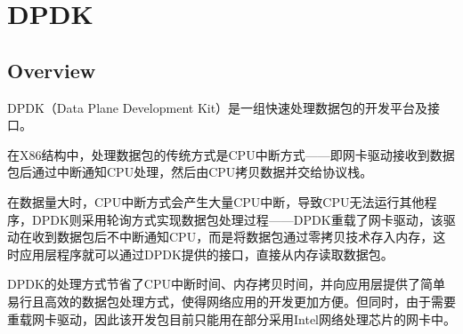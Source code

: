 \part{DPDK}


\chapter{Overview}

DPDK（Data Plane Development Kit）是一组快速处理数据包的开发平台及接口。


在X86结构中，处理数据包的传统方式是CPU中断方式——即网卡驱动接收到数据包后通过中断通知CPU处理，然后由CPU拷贝数据并交给协议栈。

在数据量大时，CPU中断方式会产生大量CPU中断，导致CPU无法运行其他程序，DPDK则采用轮询方式实现数据包处理过程——DPDK重载了网卡驱动，该驱动在收到数据包后不中断通知CPU，而是将数据包通过零拷贝技术存入内存，这时应用层程序就可以通过DPDK提供的接口，直接从内存读取数据包。

DPDK的处理方式节省了CPU中断时间、内存拷贝时间，并向应用层提供了简单易行且高效的数据包处理方式，使得网络应用的开发更加方便。但同时，由于需要重载网卡驱动，因此该开发包目前只能用在部分采用Intel网络处理芯片的网卡中。



